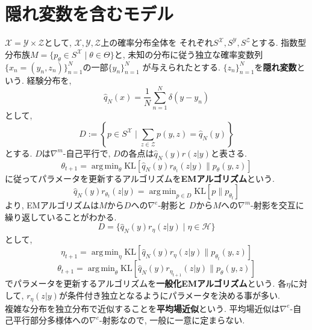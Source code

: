 \documentclass{jarticle}
\theoremstyle{definition}
\DeclareMathOperator*{\argmin}{arg\,min}
\begin{document}
\section{隠れ変数を含むモデル}
	$\mathcal{X}=\mathcal{Y}\times\mathcal{Z}$として, 
    $\mathcal{X},\mathcal{Y},\mathcal{Z}$上の確率分布全体を
    それぞれ$S^\mathcal{X},S^\mathcal{Y},S^\mathcal{Z}$とする. 
    指数型分布族$M=\{p_\theta\in S^\mathcal{X}\mid\theta\in\Theta\}$と, 
    未知の分布に従う独立な確率変数列$\{x_n=(y_n,z_n)\}_{n=1}^N$の一部$\{y_n\}_{n=1}^N$
    が与えられたとする. $\{z_n\}_{n=1}^N$を{\bf 隠れ変数}という.
    経験分布を,
    \[
   		\hat{q}_N(x)=\frac{1}{N}\sum_{n=1}^N\delta(y-y_n)
    \]
    として, 
    \[
    	D:=\left\{ p\in S^\mathcal{X} \mid \sum_{z\in\mathcal{Z}}p(y,z)=\hat{q}_N(y) \right\}
    \]
    とする. 
    $D$は$\nabla^m$-自己平行で, $D$の各点は$\hat{q}_N(y)r(z|y)$と表さる.
    \[
    	\theta_{t+1}=\argmin_{\theta}\text{KL}[\hat{q}_N(y)r_{\theta_t}(z|y) \| p_\theta(y,z)]
    \]
    に従ってパラメータを更新するアルゴリズムを{\bf EMアルゴリズム}という.
    \[
    	\hat{q}_N(y)r_{\theta_t}(z|y)=\argmin_{p\in D} \text{KL}[p\|p_{\theta_t}]
    \]
    より, EMアルゴリズムは$M$から$D$への$\nabla^e$-射影と
    $D$から$M$への$\nabla^m$-射影を交互に繰り返していることがわかる.\\
    \[
    	D=\{ \hat{q}_N(y)r_\eta(z|y) \mid \eta\in\mathcal{H} \}
    \]
    として, 
    \[
    	\eta_{t+1}=\argmin_{\eta}\text{KL}[\hat{q}_N(y)r_{\eta}(z|y) \| p_{\theta_t}(y,z)]
    \]
    \[
    	\theta_{t+1}=\argmin_{\theta}\text{KL}[\hat{q}_N(y)r_{\eta_{t+1}}(z|y) \| p_\theta(y,z)]
    \]
	でパラメータを更新するアルゴリズムを{\bf 一般化EMアルゴリズム}という. 
    各$\eta$に対して, $r_\eta(z|y)$が条件付き独立となるようにパラメータを決める事が多い. \\
    複雑な分布を独立分布で近似することを{\bf 平均場近似}という.
    平均場近似は$\nabla^e$-自己平行部分多様体への$\nabla^e$-射影なので, 一般に一意に定まらない.
\end{document}
